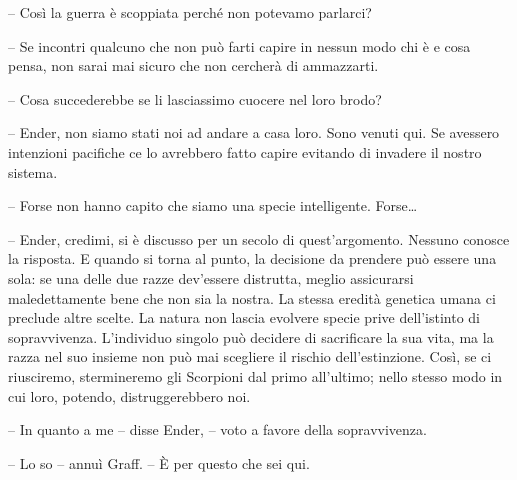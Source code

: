 {-- Così la guerra è scoppiata perché non potevamo parlarci?}

{-- Se incontri qualcuno che non può farti capire in nessun modo chi è e
	cosa pensa, non sarai mai sicuro che non cercherà di ammazzarti.}

{-- Cosa succederebbe se li lasciassimo cuocere nel loro brodo?}

{-- Ender, non siamo stati noi ad andare a casa loro. Sono venuti qui.
	Se avessero intenzioni pacifiche ce lo avrebbero fatto capire evitando
	di invadere il nostro sistema.}

{-- Forse non hanno capito che siamo una specie intelligente.
	Forse\ldots{}}

{-- Ender, credimi, si è discusso per un secolo di quest'argomento.
	Nessuno conosce la risposta. E quando si torna al punto, la decisione da
	prendere può essere una sola: se una delle due razze dev'essere
	distrutta, meglio assicurarsi maledettamente bene che non sia la nostra.
	La stessa eredità genetica umana ci preclude altre scelte. La natura non
	lascia evolvere specie prive dell'istinto di sopravvivenza. L'individuo
	singolo può decidere di sacrificare la sua vita, ma la razza nel suo
	insieme non può mai scegliere il rischio dell'estinzione. Così, se ci
	riusciremo, stermineremo gli Scorpioni dal primo all'ultimo; nello
	stesso modo in cui loro, potendo, distruggerebbero noi.}

{-- In quanto a me -- disse Ender, -- voto a favore della
	sopravvivenza.}

{-- Lo so -- annuì Graff. -- È per questo che sei qui.}

\label{Orsonux20Scottux20Cardux20-ux20Ilux20Giocoux20Diux20Enderux20-ux20BY_SLY70A1_split_016.htm}{}
